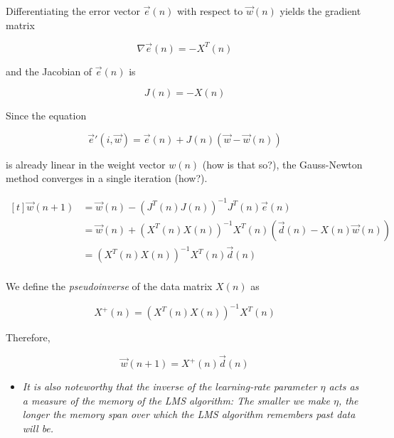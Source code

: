\documentclass[twocolumn]{article}
\begin{document}
Differentiating the error vector $ \vec{e} (n) $ with respect to $ \vec{w} (n) $ yields the gradient matrix

$$ \nabla \vec{e} (n) = - X^{T} (n) $$

\noindent and the Jacobian of $ \vec{e} (n) $ is

$$ J (n) = - X (n) $$

Since the equation

$$ \vec{e}' (i, \vec{w}) = \vec{e} (n) + J (n) ( \vec{w} - \vec{w} (n)) $$

\noindent is already linear in the weight vector $ w (n) $ (how is that so?), the Gauss-Newton method converges in a single iteration (how?). 

$$ \begin{aligned}[t]
	\vec{w} (n + 1) &= \vec{w} (n) - ( J^{T} (n) J (n))^{-1} J^{T} (n) \vec{e} (n)\\
			&= \vec{w} (n) + (X^{T} (n) X (n))^{-1}X^{T} (n) ( \vec{d} (n) - X (n) \vec{w} (n))\\
			&= (X^{T} (n) X (n))^{-1} X^{T} (n) \vec{d} (n)\\
\end{aligned} $$

We define the \textit{pseudoinverse} of the data matrix $ X (n) $ as

$$ X^{+} (n) = (X^{T} (n) X (n))^{-1} X^{T} (n) $$

Therefore,

$$ \vec{w} (n+1) = X^{+} (n) \vec{d} (n) $$

\begin{itemize}
	\item \textit{It is also noteworthy that the inverse of the learning-rate parameter $\eta$ acts as a measure of the memory of the LMS algorithm: The smaller we make $\eta$, the longer the memory span over which the LMS algorithm remembers past data will be.}
\end{itemize}
\end{document}
